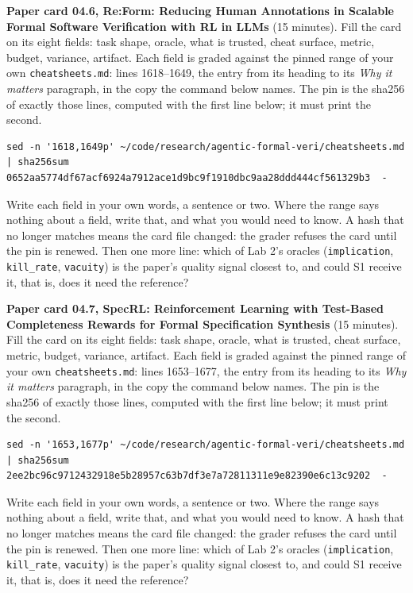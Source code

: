 \documentclass[11pt]{article}
\begin{document}
\begin{problem}\label{prob:B3}
\textbf{Paper card 04.6, Re:Form: Reducing Human Annotations in Scalable Formal Software Verification with RL in LLMs} (15 minutes). Fill the card on its eight
fields: task shape, oracle, what is trusted, cheat surface, metric, budget,
variance, artifact. Each field is graded against the pinned range of your own
\texttt{cheatsheets.md}: lines 1618--1649, the entry from its heading to its
\emph{Why it matters} paragraph, in the copy the command below names. The pin
is the sha256 of exactly those lines, computed with the first line below; it
must print the second.
{\small
\begin{verbatim}
sed -n '1618,1649p' ~/code/research/agentic-formal-veri/cheatsheets.md | sha256sum
0652aa5774df67acf6924a7912ace1d9bc9f1910dbc9aa28ddd444cf561329b3  -
\end{verbatim}
}
Write each field in your own words, a sentence or two. Where the range says
nothing about a field, write that, and what you would need to know. A hash
that no longer matches means the card file changed: the grader refuses the
card until the pin is renewed. Then one more line: which of Lab 2's oracles
(\texttt{implication}, \texttt{kill\_rate}, \texttt{vacuity}) is the paper's
quality signal closest to, and could S1 receive it, that is, does it need the
reference?
\end{problem}

\begin{problem}\label{prob:B4}
\textbf{Paper card 04.7, SpecRL: Reinforcement Learning with Test-Based Completeness Rewards for Formal Specification Synthesis} (15 minutes). Fill the card on its eight
fields: task shape, oracle, what is trusted, cheat surface, metric, budget,
variance, artifact. Each field is graded against the pinned range of your own
\texttt{cheatsheets.md}: lines 1653--1677, the entry from its heading to its
\emph{Why it matters} paragraph, in the copy the command below names. The pin
is the sha256 of exactly those lines, computed with the first line below; it
must print the second.
{\small
\begin{verbatim}
sed -n '1653,1677p' ~/code/research/agentic-formal-veri/cheatsheets.md | sha256sum
2ee2bc96c9712432918e5b28957c63b7df3e7a72811311e9e82390e6c13c9202  -
\end{verbatim}
}
Write each field in your own words, a sentence or two. Where the range says
nothing about a field, write that, and what you would need to know. A hash
that no longer matches means the card file changed: the grader refuses the
card until the pin is renewed. Then one more line: which of Lab 2's oracles
(\texttt{implication}, \texttt{kill\_rate}, \texttt{vacuity}) is the paper's
quality signal closest to, and could S1 receive it, that is, does it need the
reference?
\end{problem}
\end{document}
